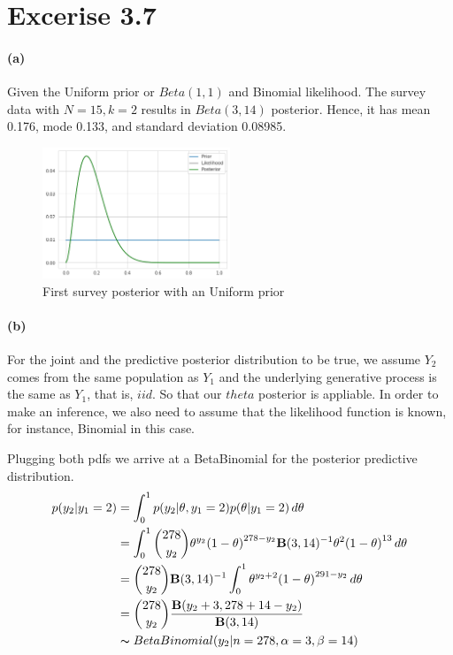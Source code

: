 \documentclass[11pt, letterpaper]{article}
\begin{document}
\section{Excerise 3.7}
\paragraph{(a)}
Given the Uniform prior or $Beta(1, 1)$ and Binomial likelihood. The survey data with $N = 15, k = 2$ results in
$Beta(3, 14)$ posterior. Hence, it has mean 0.176, mode 0.133, and standard deviation 0.08985.

\begin{figure}[h]
    \captionsetup{justification=centering, margin=2cm}
    \centering
    \includegraphics[width=0.5\textwidth]{hw2_3.7.png}
    \caption{First survey posterior with an Uniform prior}
\end{figure}

\paragraph{(b)}
For the joint and the predictive posterior distribution to be true, we assume $Y_2$ comes from the same population
as $Y_1$ and the underlying generative process is the same as $Y_1$, that is, $iid$. So that our $theta$ posterior
is appliable. In order to make an inference, we also need to assume that the likelihood function is known,
for instance, Binomial in this case.

Plugging both pdfs we arrive at a BetaBinomial for the posterior predictive distribution.
\begin{align*}
    p(y_2|y_1=2) &= \int_0^1{p(y_2|\theta, y_1=2)p(\theta|y_1=2)} \, d\theta  \\
      &= \int_0^1 {278 \choose y_2} \theta^{y_2} {(1-\theta)}^{278-y_2} \mathbf{B}(3, 14)^{-1}\theta^2{(1-\theta)}^{13} \, d\theta \\
      &= {278 \choose y_2}\mathbf{B}(3, 14)^{-1} \int_0^1 \theta^{y_2+2} {(1-\theta)}^{291-y_2} \, d\theta \\
      &= {278 \choose y_2} \frac{\mathbf{B}(y_2+3, 278+14-y_2)}{\mathbf{B}(3, 14)} \\
      &\thicksim BetaBinomial(y_2 | n=278, \alpha = 3, \beta = 14)
\end{align*}
\end{document}
